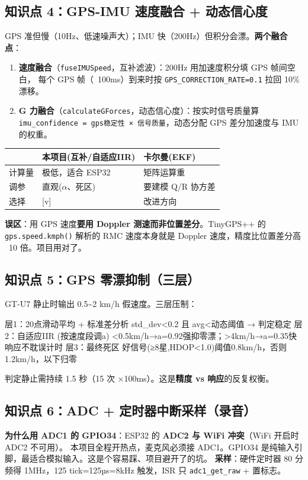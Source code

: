 \documentclass[UTF8,11pt,a4paper]{ctexart}
\begin{document}
\subsection{知识点 4：GPS-IMU 速度融合 + 动态信心度}
GPS 准但慢（10Hz、低速噪声大）；IMU 快（200Hz）但积分会漂。\textbf{两个融合点}：
\begin{enumerate}
  \item \textbf{速度融合}（\texttt{fuseIMUSpeed}，互补滤波）：200Hz 用加速度积分填 GPS 帧间空白，
        每个 GPS 帧（~100ms）到来时按 \texttt{GPS\_CORRECTION\_RATE=0.1} 拉回 10\% 漂移。
  \item \textbf{G 力融合}（\texttt{calculateGForces}，动态信心度）：按实时信号质量算
        \texttt{imu\_confidence = gps稳定性 × 信号质量}，动态分配 GPS 差分加速度与 IMU 的权重。
\end{enumerate}
\begin{center}\small
\begin{tabularx}{\linewidth}{@{}lXX@{}}
\toprule
 & \textbf{本项目(互补/自适应IIR)} & \textbf{卡尔曼(EKF)} \\
\midrule
计算量 & 极低，适合 ESP32 & 矩阵运算重 \\
调参 & 直观(\(\alpha\)、死区) & 要建模 Q/R 协方差 \\
选择 & [v] & 改进方向 \\
\bottomrule
\end{tabularx}
\end{center}
\textbf{误区}：用 GPS 速度\textbf{要用 Doppler 测速而非位置差分}。TinyGPS++ 的 \texttt{gps.speed.kmph()}
解析的 RMC 速度本身就是 Doppler 速度，精度比位置差分高 ~10 倍。项目用对了。

\subsection{知识点 5：GPS 零漂抑制（三层）}
GT-U7 静止时输出 0.5\textasciitilde 2 km/h 假速度。三层压制：
\begin{ascii}
层1：20点滑动平均 + 标准差分析   std_dev<0.2 且 avg<动态阈值 → 判定稳定
层2：自适应IIR (按速度段调a)     <0.5km/h→a=0.92强抑零漂；>4km/h→a=0.35快响应不耽误计时
层3：最终死区                    好信号(≥8星,HDOP<1.0)阈值0.8km/h，否则1.2km/h，以下归零
\end{ascii}
判定静止需持续 1.5 秒（15 次 ×100ms）。这是\textbf{精度 vs 响应}的反复权衡。

\subsection{知识点 6：ADC + 定时器中断采样（录音）}
\textbf{为什么用 ADC1 的 GPIO34}：ESP32 的 \textbf{ADC2 与 WiFi 冲突}（WiFi 开启时 ADC2 不可用）。
本项目全程开热点，麦克风必须接 ADC1。GPIO34 是纯输入引脚，最适合模拟输入。这是个容易踩、项目避开了的坑。
\textbf{采样}：硬件定时器 80 分频得 1MHz，125 tick=125µs=8kHz 触发，ISR 只 \texttt{adc1\_get\_raw} + 置标志。
\end{document}

